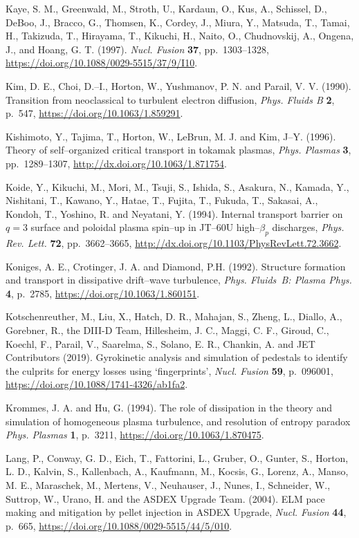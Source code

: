 \documentclass[a4paper,openany,12pt]{book}
\begin{document}
{\begin{thebibliography}{100}
\bibitem{}
Kaye, S. M., Greenwald, M., Stroth, U., Kardaun, O., Kus, A., Schissel, D., DeBoo, J., Bracco, G., Thomsen, K., Cordey, J., Miura, Y., Matsuda, T., Tamai, H., Takizuda, T., Hirayama, T., Kikuchi, H., Naito, O., Chudnovskij, A., Ongena, J., and Hoang, G. T. (1997). \emph{Nucl. Fusion} \textbf{37}, pp.~1303--1328,
\url{https://doi.org/10.1088/0029-5515/37/9/I10}.

\bibitem{}
Kim, D. E., Choi, D.--I., Horton, W., Yushmanov, P. N. and Parail, V. V. (1990). Transition from neoclassical to turbulent electron diffusion, \emph{Phys. Fluids B} \textbf{2}, p.~547, \url{https://doi.org/10.1063/1.859291}.

\bibitem{}
Kishimoto, Y., Tajima, T., Horton, W., LeBrun, M. J. and Kim, J--Y. (1996). Theory of self--organized critical transport in tokamak plasmas, \emph{Phys. Plasmas} \textbf{3}, pp.~1289--1307, \url{http://dx.doi.org/10.1063/1.871754}.

\bibitem{}
Koide, Y., Kikuchi, M., Mori, M., Tsuji, S., Ishida, S., Asakura, N., Kamada, Y., Nishitani, T., Kawano, Y., Hatae, T., Fujita, T., Fukuda, T., Sakasai, A., Kondoh, T., Yoshino, R. and Neyatani, Y. (1994). Internal transport barrier on $q=3$ surface and poloidal plasma spin--up in JT--60U high--$\beta_p$ discharges, \emph{Phys. Rev. Lett.} \textbf{72}, 
pp.~3662--3665, \url{http://dx.doi.org/10.1103/PhysRevLett.72.3662}.

\bibitem{}
Koniges, A. E., Crotinger, J. A. and Diamond, P.H. (1992). Structure formation and transport in dissipative drift--wave turbulence, {\em Phys. Fluids~B: Plasma Phys.} \textbf{4}, p.~2785, \url{https://doi.org/10.1063/1.860151}.

\bibitem{}
Kotschenreuther, M., Liu, X., Hatch, D. R., Mahajan, S., Zheng, L., Diallo, A., Gorebner, R., the DIII-D Team, Hillesheim, J. C., Maggi, C. F., Giroud, C., Koechl, F., Parail, V., Saarelma, S., Solano, E. R., Chankin, A. and JET Contributors (2019). Gyrokinetic analysis and simulation of pedestals to identify the culprits for energy losses using `fingerprints', \emph{Nucl. Fusion} \textbf{59}, p.~096001, \url{https://doi.org/10.1088/1741-4326/ab1fa2}.

\bibitem{}
Krommes, J. A. and Hu, G. (1994). The role of dissipation in the theory and simulation of homogeneous plasma turbulence, and resolution of entropy paradox \emph{Phys. Plasmas} \textbf{1}, p.~3211, \url{https://doi.org/10.1063/1.870475}.

\bibitem{}
Lang, P., Conway, G. D., Eich, T., Fattorini, L., Gruber, O., G\:unter, S., Horton, L. D., Kalvin, S., Kallenbach, A., Kaufmann, M., Kocsis, G., Lorenz, A., Manso, M. E., Maraschek, M., Mertens, V., Neuhauser, J., Nunes, I., Schneider, W., Suttrop, W., Urano, H. and the ASDEX Upgrade Team. (2004). ELM pace making and mitigation by pellet injection in ASDEX Upgrade, \emph{Nucl. Fusion} \textbf{44}, p.~665, \url{https://doi.org/10.1088/0029-5515/44/5/010}.


\end{thebibliography}}
\end{document}
